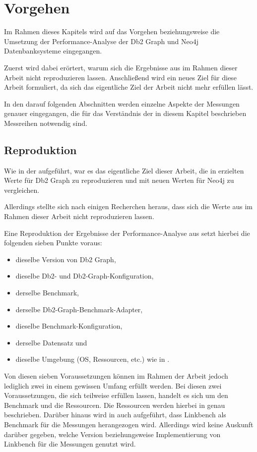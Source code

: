 \chapter{Vorgehen}
\label{vorgehen}
Im Rahmen dieses Kapitels wird auf das Vorgehen beziehungsweise die Umsetzung der Performance-Analyse der Db2 Graph und Neo4j Datenbanksysteme eingegangen. 

Zuerst wird dabei erörtert, warum sich die Ergebnisse aus \cite{sigmod_tian} im Rahmen dieser Arbeit nicht reproduzieren lassen. Anschließend wird ein neues Ziel für diese Arbeit formuliert, da sich das eigentliche Ziel der Arbeit nicht mehr erfüllen lässt. 

In den darauf folgenden Abschnitten werden einzelne Aspekte der Messungen genauer eingegangen, die für das Verständnis der in diesem Kapitel beschrieben Messreihen notwendig sind.

\section{Reproduktion}
\label{analyse:reproduktion}
Wie in der  aufgeführt, war es das eigentliche Ziel dieser Arbeit, die in \cite{sigmod_tian} erzielten Werte für Db2 Graph zu reproduzieren und mit neuen Werten für Neo4j zu vergleichen. 

Allerdings stellte sich nach einigen Recherchen heraus, dass sich die Werte aus \cite{sigmod_tian} im Rahmen dieser Arbeit nicht reproduzieren lassen. 

Eine Reproduktion der Ergebnisse der Performance-Analyse aus \cite{sigmod_tian} setzt hierbei die folgenden sieben Punkte voraus:
\begin{itemize}
    \item dieselbe Version von Db2 Graph,
    \item dieselbe Db2- und Db2-Graph-Konfiguration,
    \item derselbe Benchmark,
    \item derselbe Db2-Graph-Benchmark-Adapter,
    \item dieselbe Benchmark-Konfiguration,
    \item derselbe Datensatz und 
    \item dieselbe Umgebung (OS, Ressourcen, etc.) wie in \cite{sigmod_tian}.
\end{itemize}
Von diesen sieben Voraussetzungen können im Rahmen der Arbeit jedoch lediglich zwei in einem gewissen Umfang erfüllt werden. Bei diesen zwei Voraussetzungen, die sich teilweise erfüllen lassen, handelt es sich um den Benchmark und die Ressourcen. Die Ressourcen werden hierbei in \cite{sigmod_tian} genau beschrieben. Darüber hinaus wird in \cite{sigmod_tian} auch aufgeführt, dass Linkbench als Benchmark für die Messungen herangezogen wird. Allerdings wird keine Auskunft darüber gegeben, welche Version beziehungsweise Implementierung von Linkbench für die Messungen genutzt wird.

